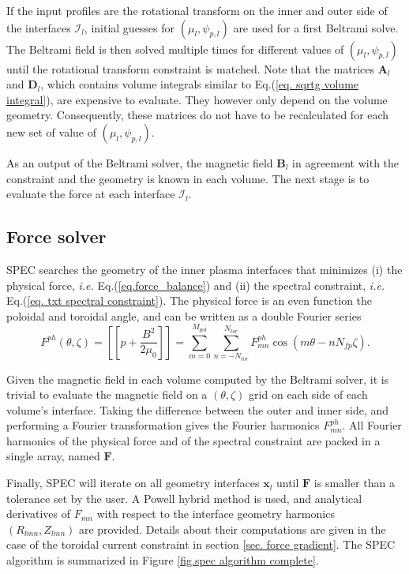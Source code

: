 \documentclass[my_thesis.tex]{subfiles}
\begin{document}
If the input profiles are the rotational transform on the inner and outer side of the interfaces $\mathcal{I}_l$, initial guesses for $(\mu_l,\psi_{p,l})$ are used for a first Beltrami solve. The Beltrami field is then solved multiple times for different values of $(\mu_l,\psi_{p,l})$ until the rotational transform constraint is matched. Note that the matrices $\mathbf{A}_l$ and $\mathbf{D}_l$, which contains volume integrals similar to Eq.(\ref{eq. sqrtg volume integral}), are expensive to evaluate. They however only depend on the volume geometry. Consequently, these matrices do not have to be recalculated for each new set of value of $(\mu_l,\psi_{p,l})$.

As an output of the Beltrami solver, the magnetic field $\mathbf{B}_l$ in agreement with the constraint and the geometry is known in each volume. The next stage is to evaluate the force at each interface $\mathcal{I}_l$.



\subsection{Force solver}
SPEC searches the geometry of the inner plasma interfaces that minimizes (i) the physical force, \textit{i.e.} Eq.(\ref{eq.force_balance}) and (ii) the spectral constraint, \textit{i.e.} Eq.(\ref{eq. txt spectral constraint}). The physical force is an even function the poloidal and toroidal angle, and can be written as a double Fourier series 
\begin{equation}
	F^{ph}(\theta,\zeta) = \left[\left[ p + \frac{B^2}{2\mu_0}\right]\right] = \sum_{m=0}^{M_{pol}}\sum_{n=-N_{tor}}^{N_{tor}} F^{ph}_{mn}\cos(m\theta-nN_{fp}\zeta).
\end{equation}

Given the magnetic field in each volume computed by the Beltrami solver, it is trivial to evaluate the magnetic field on a $(\theta,\zeta)$ grid on each side of each volume's interface. Taking the difference between the outer and inner side, and performing a Fourier transformation gives the Fourier harmonics $F^{ph}_{mn}$. All Fourier harmonics of the physical force and of the spectral constraint are packed in a single array, named $\mathbf{F}$.

Finally, SPEC will iterate on all geometry interfaces $\mathbf{x}_l$ until $\mathbf{F}$ is smaller than a tolerance set by the user. A Powell hybrid method is used, and analytical derivatives of $F_{mn}$ with respect to the interface geometry harmonics $(R_{lmn}, Z_{lmn})$ are provided. Details about their computations are given in the case of the toroidal current constraint in section \ref{sec. force gradient}. The SPEC algorithm is summarized in Figure \ref{fig.spec algorithm complete}. 
\end{document}
